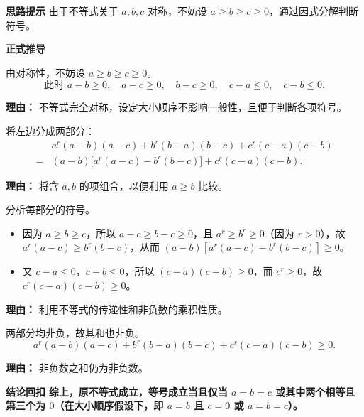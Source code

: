\begin{proofbox}
\textbf{\textcolor{CProof}{思路提示}}
由于不等式关于 $a, b, c$ 对称，不妨设 $a \ge b \ge c \ge 0$，通过因式分解判断符号。

\medskip
\textbf{\textcolor{CProof}{正式推导}}
\begin{description}[style=nextline, leftmargin=2.8em, labelsep=0.5em, itemsep=0.55em]
    \item[\textbf{步骤一（对称假设）：}] 由对称性，不妨设 $a \ge b \ge c \ge 0$。
    \[
    \text{此时 } a-b \ge 0, \quad a-c \ge 0, \quad b-c \ge 0, \quad c-a \le 0, \quad c-b \le 0.
    \]
    \par\textbf{理由：}
    不等式完全对称，设定大小顺序不影响一般性，且便于判断各项符号。

    \item[\textbf{步骤二（重新分组）：}] 将左边分成两部分：
    \[
    \begin{aligned}
        & a^{r}(a-b)(a-c) + b^{r}(b-a)(b-c) + c^{r}(c-a)(c-b) \\
        =& (a-b)\bigl[a^{r}(a-c) - b^{r}(b-c)\bigr] + c^{r}(c-a)(c-b).
    \end{aligned}
    \]
    \par\textbf{理由：}
    将含 $a,b$ 的项组合，以便利用 $a \ge b$ 比较。

    \item[\textbf{步骤三（判断符号）：}] 分析每部分的符号。
    \begin{itemize}
        \item 因为 $a \ge b \ge c$，所以 $a-c \ge b-c \ge 0$，且 $a^{r} \ge b^{r} \ge 0$（因为 $r>0$），故 $a^{r}(a-c) \ge b^{r}(b-c)$，从而 $(a-b)[a^{r}(a-c)-b^{r}(b-c)] \ge 0$。
        \item 又 $c-a \le 0$，$c-b \le 0$，所以 $(c-a)(c-b) \ge 0$，而 $c^{r} \ge 0$，故 $c^{r}(c-a)(c-b) \ge 0$。
    \end{itemize}
    \par\textbf{理由：}
    利用不等式的传递性和非负数的乘积性质。

    \item[\textbf{步骤四（得出结论）：}] 两部分均非负，故其和也非负。
    \[
    a^{r}(a-b)(a-c) + b^{r}(b-a)(b-c) + c^{r}(c-a)(c-b) \ge 0.
    \]
    \par\textbf{理由：}
    非负数之和仍为非负数。
\end{description}

\medskip
\textbf{\textcolor{CProof}{结论回扣}}
\textbf{综上，原不等式成立，等号成立当且仅当 $a=b=c$ 或其中两个相等且第三个为 $0$（在大小顺序假设下，即 $a=b$ 且 $c=0$ 或 $a=b=c$）。}
\end{proofbox}
